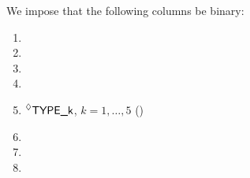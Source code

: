We impose that the following columns be binary:
\begin{multicols}{3}
	\begin{enumerate}
		\item \roob{}
		\item \noop{}
		\item \mxpx{}
		\item \codeDeployment{}
                \item $\prescript{\lozenge}{}{\textsf{TYPE\_k}}$, $k = 1,\dots,5$ (\trash)
		\item \comp{}
		\item \mexpEvent{}
		\item \mayTriggerNonTrivialOperation{}
	\end{enumerate}
\end{multicols}
